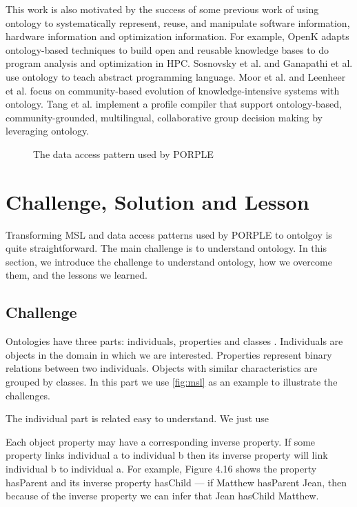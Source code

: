 \documentclass{sig-alternate}
\begin{document}
This work is also motivated by the success of some previous work of using ontology to systematically represent, reuse, and manipulate software information, hardware information and optimization information. For example, OpenK adapts ontology-based techniques to build open and reusable knowledge bases to do program analysis and optimization in HPC. Sosnovsky et al. \cite{work1} and Ganapathi \cite{work2} et al. use ontology to teach abstract programming language. Moor et al. \cite{ontology3} and Leenheer et al. \cite{ontology4} focus on community-based evolution of knowledge-intensive systems with ontology. Tang et al. \cite{ontology5} implement a profile compiler that support ontology-based, community-grounded, multilingual, collaborative group decision making by leveraging ontology. 

\begin{figure*}
\centering
{}
\caption{The memory specification of Tesla M2075 in MSL}
\label{fig:msl}
\end{figure*}

\begin{figure}
\centering
{}
\caption{The data access pattern used by PORPLE}
\label{fig:dap}
\end{figure}

\section{Challenge, Solution and Lesson}
Transforming MSL and data access patterns used by PORPLE to ontolgoy is quite straightforward. The main challenge is to understand ontology. In this section, we introduce the challenge to understand ontology, how we overcome them, and the lessons we learned.

\subsection{Challenge}
Ontologies have three parts: individuals, properties and classes \cite{what1}. Individuals are objects in the domain in which we are interested. Properties represent binary relations between two individuals. Objects with similar characteristics are grouped by classes. In this part we use \ref{fig:msl} as an example to illustrate the challenges. 

The individual part is related easy to understand. We just use 

Each object property may have a corresponding inverse property. If some property links individual a to individual b then its inverse property will link individual b to individual a. For example, Figure 4.16 shows the property hasParent and its inverse property hasChild — if Matthew hasParent Jean, then because of the inverse property we can infer that Jean hasChild Matthew.
\end{document}
